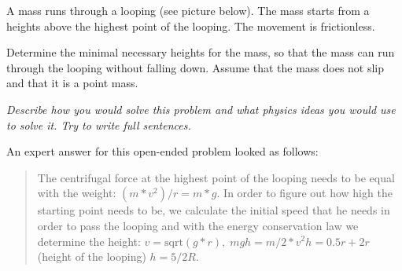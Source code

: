 \documentclass[]{interact}
\begin{document}
\begin{tcolorbox}
A mass runs through a looping (see picture below). The mass starts from a heights above the highest point of the looping. The movement is frictionless.

Determine the minimal necessary heights for the mass, so that the mass can run through the looping without falling down. Assume that the mass does not slip and that it is a point mass.

\textit{Describe how you would solve this problem and what physics ideas you would use to solve it. Try to write full sentences.}

\begin{center}

\end{center}
\end{tcolorbox}

An expert answer for this open-ended problem looked as follows: 
\begin{quote}
The centrifugal force at the highest point of the looping needs to be equal with the weight: $(m*v^2)/r=m*g$. In order to figure out how high the starting point needs to be, we calculate the initial speed that he needs in order to pass the looping and with the energy conservation law we determine the height: $v=\text{sqrt}(g*r), \; mgh=m/2*v^2 h=0.5r+2r$ (height of the looping) $h=5/2R$.

\end{quote}
\end{document}
